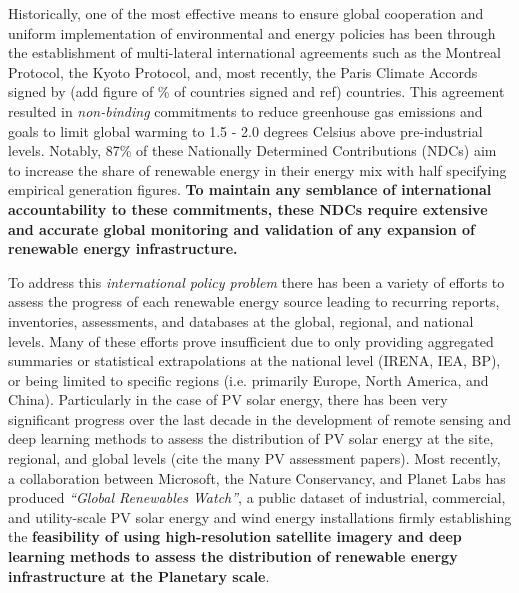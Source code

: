 Historically, one of the most effective means to ensure global cooperation and uniform implementation of environmental and energy policies has been through the establishment of multi-lateral 
international agreements such as the Montreal Protocol, the Kyoto Protocol, and, most recently, the Paris Climate Accords signed by (add figure of \% of countries signed and ref) countries. 
This agreement resulted in \textit{non-binding} commitments to reduce greenhouse gas emissions and goals to limit global warming to 1.5 - 2.0 degrees Celsius above pre-industrial levels. 
Notably, 87\% of these Nationally Determined Contributions (NDCs) aim to increase the share of renewable energy in their energy mix with half specifying empirical generation figures\cite{robinson_ms_planet_global_renewables_watch_2025}. 
\textbf{To maintain any semblance of international accountability to these commitments, these NDCs require extensive and accurate global monitoring and validation of any expansion of renewable energy infrastructure.}

To address this \textit{international policy problem} there has been a variety of efforts to assess the progress of each renewable energy source leading to recurring reports, inventories, assessments, and databases at the global, 
regional, and national levels. Many of these efforts prove insufficient due to only providing aggregated summaries or statistical extrapolations at the national level (IRENA, IEA, BP), or being limited to specific regions 
(i.e. primarily Europe, North America, and China). Particularly in the case of PV solar energy, there has been very significant progress over the last decade in the development of remote sensing and deep learning methods to assess 
the distribution of PV solar energy at the site, regional, and global levels (cite the many PV assessment papers).
Most recently, a collaboration between Microsoft, the Nature Conservancy, and Planet Labs\cite{robinson_ms_planet_global_renewables_watch_2025} has produced \textit{``Global Renewables Watch''}, 
a public dataset of industrial, commercial, and utility-scale PV solar energy and wind energy installations firmly establishing the \textbf{feasibility of using high-resolution satellite imagery and deep learning methods 
to assess the distribution of renewable energy infrastructure at the Planetary scale}.

